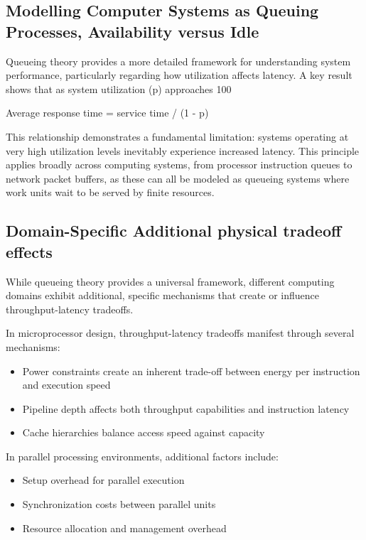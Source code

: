 \documentclass[english,12pt,a4paper,pdftex,sci,utf8]{aaltothesis}
\begin{document}
\subsection{Modelling Computer Systems as Queuing Processes, Availability versus Idle}
Queueing theory provides a more detailed framework for understanding system performance, particularly regarding how utilization affects latency. A key result shows that as system utilization (p) approaches 100%

Average response time = service time / (1 - p)

This relationship demonstrates a fundamental limitation: systems operating at very high utilization levels inevitably experience increased latency. This principle applies broadly across computing systems, from processor instruction queues to network packet buffers, as these can all be modeled as queueing systems where work units wait to be served by finite resources.

\subsection{Domain-Specific Additional physical tradeoff effects}

While queueing theory provides a universal framework, different computing domains exhibit additional, specific mechanisms that create or influence throughput-latency tradeoffs.

In microprocessor design, throughput-latency tradeoffs manifest through several mechanisms:
\begin{itemize}
    \item Power constraints create an inherent trade-off between energy per instruction and execution speed
    \item Pipeline depth affects both throughput capabilities and instruction latency
    \item Cache hierarchies balance access speed against capacity
\end{itemize}

In parallel processing environments, additional factors include:
\begin{itemize}
    \item Setup overhead for parallel execution
    \item Synchronization costs between parallel units
    \item Resource allocation and management overhead
\end{itemize}
\end{document}
